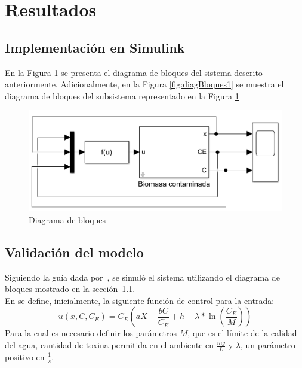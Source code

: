 \section{Resultados}
\label{sec:results}

\subsection{Implementación en Simulink}
\label{sec:simulink}
En la Figura \ref{fig:diagBloques} se presenta el diagrama de bloques del sistema descrito anteriormente. Adicionalmente, en la Figura \ref{fig:diagBloques1} se muestra el diagrama de bloques del subsistema representado en la Figura \ref{fig:diagBloques}

\begin{figure}[ht!]
\centering
\includegraphics[scale = 0.4]{diagrama-de-bloques1}
\caption{Diagrama de bloques}
\label{fig:diagBloques}
\end{figure}

\subsection{Validación del modelo}
\label{sec:validation}

Siguiendo la guía dada por~\cite{1}, se simuló el sistema utilizando el diagrama de bloques mostrado en la sección~\ref{sec:simulink}. \\
En \cite{1} se define, inicialmente, la siguiente función de control para la entrada:
\begin{equation}
\label{eq:entrada}
u(x, C, C_E) = C_E\left( aX - \frac{bC}{C_E}+ h - \lambda * \ln\left({\frac{C_E}{M}}\right) \right)
\end{equation}
Para la cual es necesario definir los parámetros $M$, que es el límite de la calidad del agua, cantidad de toxina permitida en el ambiente en $\frac{mg}{L}$ y
$\lambda$, un parámetro positivo en $\frac{1}{s}$. \\

